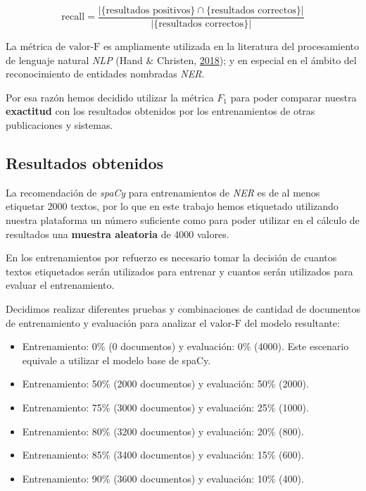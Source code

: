 \documentclass[12pt,a4paper,]{scrartcl}
\providecommand{\tightlist}{%
  \setlength{\itemsep}{0pt}\setlength{\parskip}{0pt}}
\begin{document}
\[
\text{recall}=\frac{|\{\text{resultados positivos}\}\cap\{\text{resultados correctos}\}|}{|\{\text{resultados correctos}\}|}
\]

La métrica de \(\text{valor-F}\) es ampliamente utilizada en la literatura del procesamiento de lenguaje natural \emph{NLP} (Hand \& Christen, \protect\hyperlink{ref-pub_1084928040}{2018}); y en especial en el ámbito del reconocimiento de entidades nombradas \emph{NER}.

Por esa razón hemos decidido utilizar la métrica \(F_1\) para poder comparar nuestra \textbf{exactitud} con los resultados obtenidos por los entrenamientos de otras publicaciones y sistemas.

\hypertarget{result-data}{%
\subsection{Resultados obtenidos}\label{result-data}}

La recomendación de \emph{spaCy} para entrenamientos de \emph{NER} es de al menos etiquetar 2000 textos, por lo que en este trabajo hemos etiquetado utilizando nuestra plataforma un número suficiente como para poder utilizar en el cálculo de resultados una \textbf{muestra aleatoria} de 4000 valores.

En los entrenamientos por refuerzo es necesario tomar la decisión de cuantos textos etiquetados serán utilizados para entrenar y cuantos serán utilizados para evaluar el entrenamiento.

Decidimos realizar diferentes pruebas y combinaciones de cantidad de documentos de entrenamiento y evaluación para analizar el \(\text{valor-F}\) del modelo resultante:

\begin{itemize}
\tightlist
\item
  Entrenamiento: 0\% (0 documentos) y evaluación: 0\% (4000). Este escenario equivale a utilizar el modelo base de spaCy.
\item
  Entrenamiento: 50\% (2000 documentos) y evaluación: 50\% (2000).
\item
  Entrenamiento: 75\% (3000 documentos) y evaluación: 25\% (1000).
\item
  Entrenamiento: 80\% (3200 documentos) y evaluación: 20\% (800).
\item
  Entrenamiento: 85\% (3400 documentos) y evaluación: 15\% (600).
\item
  Entrenamiento: 90\% (3600 documentos) y evaluación: 10\% (400).
\end{itemize}
\end{document}
